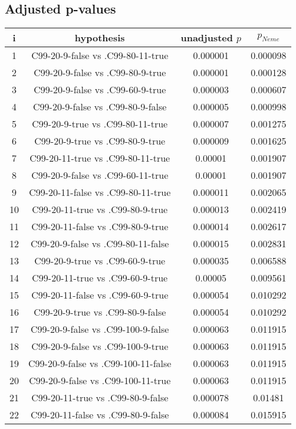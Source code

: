 \documentclass[a4paper,10pt]{article}
\begin{document}
\begin{landscape}
\pagebreak

\subsection{Adjusted p-values}

\begin{table}[!htp]
\centering\scriptsize
\begin{tabular}{cccc}
i&hypothesis&unadjusted $p$&$p_{Neme}$\\
\hline1&C99-20-9-false vs .C99-80-11-true&0.000001&0.000098\\
2&C99-20-9-false vs .C99-80-9-true&0.000001&0.000128\\
3&C99-20-9-false vs .C99-60-9-true&0.000003&0.000607\\
4&C99-20-9-false vs .C99-80-9-false&0.000005&0.000998\\
5&C99-20-9-true vs .C99-80-11-true&0.000007&0.001275\\
6&C99-20-9-true vs .C99-80-9-true&0.000009&0.001625\\
7&C99-20-11-true vs .C99-80-11-true&0.00001&0.001907\\
8&C99-20-9-false vs .C99-60-11-true&0.00001&0.001907\\
9&C99-20-11-false vs .C99-80-11-true&0.000011&0.002065\\
10&C99-20-11-true vs .C99-80-9-true&0.000013&0.002419\\
11&C99-20-11-false vs .C99-80-9-true&0.000014&0.002617\\
12&C99-20-9-false vs .C99-80-11-false&0.000015&0.002831\\
13&C99-20-9-true vs .C99-60-9-true&0.000035&0.006588\\
14&C99-20-11-true vs .C99-60-9-true&0.00005&0.009561\\
15&C99-20-11-false vs .C99-60-9-true&0.000054&0.010292\\
16&C99-20-9-true vs .C99-80-9-false&0.000054&0.010292\\
17&C99-20-9-false vs .C99-100-9-false&0.000063&0.011915\\
18&C99-20-9-false vs .C99-100-9-true&0.000063&0.011915\\
19&C99-20-9-false vs .C99-100-11-false&0.000063&0.011915\\
20&C99-20-9-false vs .C99-100-11-true&0.000063&0.011915\\
21&C99-20-11-true vs .C99-80-9-false&0.000078&0.01481\\
22&C99-20-11-false vs .C99-80-9-false&0.000084&0.015915\\

\end{tabular}
\end{table}
\end{landscape}
\end{document}
